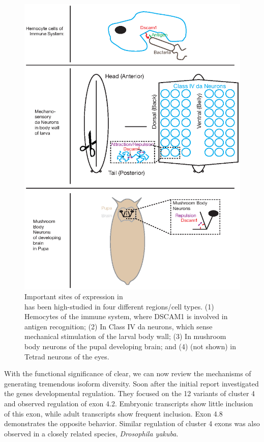     \begin{figure} %
      \centering 
      \includegraphics{Figures/Intro/DscamAnatomy.eps}
      \caption[Important sites of \dscam{} expression in \flies{}]
      {
        Important sites of \dscam{} expression in \flies{} \\[0.25cm]
        \dscam{} has been high-studied in four different regions/cell types. (1) Hemocytes of the immune system, where DSCAM1 is involved in antigen recognition; (2) In Class IV da neurons, which sense mechanical stimulation of the larval body wall; (3) In mushroom body neurons of the pupal developing brain; and (4) (not shown) in Tetrad neurons of the eyes.
        }
      \label{Intro:fig:DscamAnatomy}
      \end{figure}

    With the functional significance of \dscam{} clear, we can now review the mechanisms of generating tremendous isoform diversity. Soon after the initial \dscam{} report \citet{Celotto2001} investigated the genes developmental regulation. They focused on the 12 variants of cluster 4 and observed regulation of exon 4.2. Embryonic transcripts show little inclusion of this exon, while adult transcripts show frequent inclusion. Exon 4.8 demonstrates the opposite behavior. Similar regulation of cluster 4 exons was also observed in a closely related species, \textit{Drosophila yakuba}.

